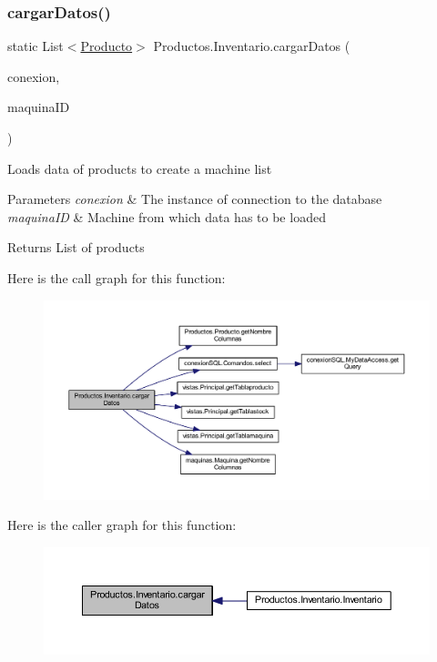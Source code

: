 \subsubsection{\texorpdfstring{cargar\+Datos()}{cargarDatos()}}
{\footnotesize\ttfamily static List$<$\mbox{\hyperlink{class_productos_1_1_producto}{Producto}}$>$ Productos.\+Inventario.\+cargar\+Datos (\begin{DoxyParamCaption}\item[{\mbox{\hyperlink{classconexion_s_q_l_1_1_my_data_access}{My\+Data\+Access}}}]{conexion,  }\item[{int}]{maquina\+ID }\end{DoxyParamCaption})\hspace{0.3cm}{\ttfamily [static]}}

Loads data of products to create a machine list 
\begin{DoxyParams}{Parameters}
{\em conexion} & The instance of connection to the database \\
\hline
{\em maquina\+ID} & Machine from which data has to be loaded \\
\hline
\end{DoxyParams}
\begin{DoxyReturn}{Returns}
List of products 
\end{DoxyReturn}
Here is the call graph for this function\+:
\nopagebreak
\begin{figure}[H]
\begin{center}
\leavevmode
\includegraphics[width=350pt]{class_productos_1_1_inventario_a89ddb54b03480d0e837f56be549b755c_cgraph}
\end{center}
\end{figure}
Here is the caller graph for this function\+:
\nopagebreak
\begin{figure}[H]
\begin{center}
\leavevmode
\includegraphics[width=350pt]{class_productos_1_1_inventario_a89ddb54b03480d0e837f56be549b755c_icgraph}
\end{center}
\end{figure}
